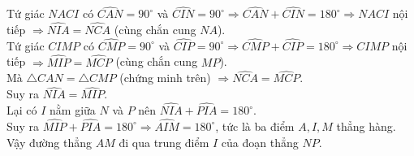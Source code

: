 \begin{ex}
{\begin{itemize}
    Tứ giác $NACI$ có $\widehat{CAN} = 90^\circ$ và $\widehat{CIN} = 90^\circ \Rightarrow \widehat{CAN} + \widehat{CIN} = 180^\circ \Rightarrow NACI$ nội tiếp $\Rightarrow \widehat{NIA} = \widehat{NCA}$ (cùng chắn cung $NA$).\\
    Tứ giác $CIMP$ có $\widehat{CMP} = 90^\circ$ và $\widehat{CIP} = 90^\circ \Rightarrow \widehat{CMP} + \widehat{CIP} = 180^\circ \Rightarrow CIMP$ nội tiếp $\Rightarrow \widehat{MIP} = \widehat{MCP}$ (cùng chắn cung $MP$).\\
    Mà $\triangle CAN = \triangle CMP$ (chứng minh trên) $\Rightarrow \widehat{NCA} = \widehat{MCP}$.\\
    Suy ra $\widehat{NIA} = \widehat{MIP}$.\\
    Lại có $I$ nằm giữa $N$ và $P$ nên $\widehat{NIA} + \widehat{PIA} = 180^\circ$.\\
    Suy ra $\widehat{MIP} + \widehat{PIA} = 180^\circ \Rightarrow \widehat{AIM} = 180^\circ$, tức là ba điểm $A, I, M$ thẳng hàng.\\
    Vậy đường thẳng $AM$ đi qua trung điểm $I$ của đoạn thẳng $NP$.
\end{itemize}
}
\end{ex}
